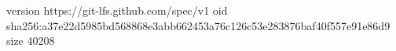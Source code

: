 version https://git-lfs.github.com/spec/v1
oid sha256:a37e22d5985bd568868e3abb662453a76c126c53e283876baf40f557e91e86d9
size 40208
